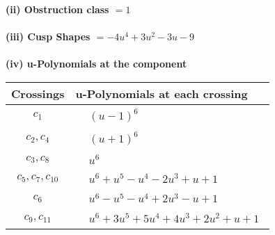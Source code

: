 \documentclass[1p]{elsarticle_modified}
\theoremstyle{definition}
\begin{document}
\flushleft \textbf{(ii) Obstruction class $= 1$}\\~\\
\flushleft \textbf{(iii) Cusp Shapes $= -4 u^4+3 u^2-3 u-9$}\\~\\
\newpage\renewcommand{\arraystretch}{1}
\flushleft \textbf{(iv) u-Polynomials at the component}\newline \\
\begin{tabular}{m{50pt}|m{274pt}}
Crossings & \hspace{64pt}u-Polynomials at each crossing \\
\hline $$\begin{aligned}c_{1}\end{aligned}$$&$\begin{aligned}
&(u-1)^6
\end{aligned}$\\
\hline $$\begin{aligned}c_{2},c_{4}\end{aligned}$$&$\begin{aligned}
&(u+1)^6
\end{aligned}$\\
\hline $$\begin{aligned}c_{3},c_{8}\end{aligned}$$&$\begin{aligned}
&u^6
\end{aligned}$\\
\hline $$\begin{aligned}c_{5},c_{7},c_{10}\end{aligned}$$&$\begin{aligned}
&u^6+u^5- u^4-2 u^3+u+1
\end{aligned}$\\
\hline $$\begin{aligned}c_{6}\end{aligned}$$&$\begin{aligned}
&u^6- u^5- u^4+2 u^3- u+1
\end{aligned}$\\
\hline $$\begin{aligned}c_{9},c_{11}\end{aligned}$$&$\begin{aligned}
&u^6+3 u^5+5 u^4+4 u^3+2 u^2+u+1
\end{aligned}$\\
\hline
\end{tabular}\\~\\
\end{document}
